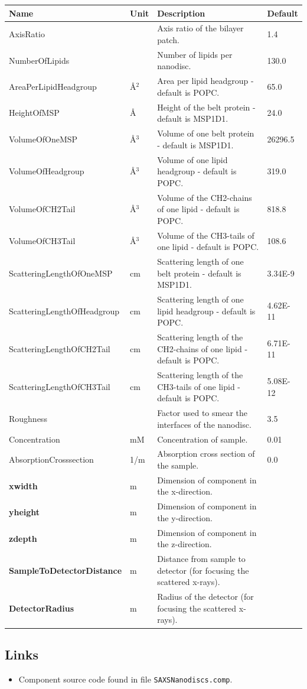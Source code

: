 \begin{longtable}{p{}p{}p{}p{}}
\toprule
\textbf{Name} & \textbf{Unit} & \textbf{Description} & \textbf{Default} \\
\midrule
\endhead
AxisRatio &  & Axis ratio of the bilayer patch. & 1.4 \\
NumberOfLipids &  & Number of lipids per nanodisc. & 130.0 \\
AreaPerLipidHeadgroup & \AA{}$^{2}$ & Area per lipid headgroup - default is POPC. & 65.0 \\
HeightOfMSP & \AA{} & Height of the belt protein - default is MSP1D1. & 24.0 \\
VolumeOfOneMSP & \AA{}$^{3}$ & Volume of one belt protein - default is MSP1D1. & 26296.5 \\
VolumeOfHeadgroup & \AA{}$^{3}$ & Volume of one lipid headgroup - default is POPC. & 319.0 \\
VolumeOfCH2Tail & \AA{}$^{3}$ & Volume of the CH2-chains of one lipid - default is POPC. & 818.8 \\
VolumeOfCH3Tail & \AA{}$^{3}$ & Volume of the CH3-tails of one lipid - default is POPC. & 108.6 \\
ScatteringLengthOfOneMSP & cm & Scattering length of one belt protein - default is MSP1D1. & 3.34E-9 \\
ScatteringLengthOfHeadgroup & cm & Scattering length of one lipid headgroup - default is POPC. & 4.62E-11 \\
ScatteringLengthOfCH2Tail & cm & Scattering length of the CH2-chains of one lipid - default is POPC. & 6.71E-11 \\
ScatteringLengthOfCH3Tail & cm & Scattering length of the CH3-tails of one lipid - default is POPC. & 5.08E-12 \\
Roughness &  & Factor used to smear the interfaces of the nanodisc. & 3.5 \\
Concentration & mM & Concentration of sample. & 0.01 \\
AbsorptionCrosssection & 1/m & Absorption cross section of the sample. & 0.0 \\
\textbf{xwidth} & m & Dimension of component in the x-direction. &  \\
\textbf{yheight} & m & Dimension of component in the y-direction. &  \\
\textbf{zdepth} & m & Dimension of component in the z-direction. &  \\
\textbf{SampleToDetectorDistance} & m & Distance from sample to detector (for focusing the scattered x-rays). &  \\
\textbf{DetectorRadius} & m & Radius of the detector (for focusing the scattered x-rays). &  \\
\bottomrule
\end{longtable}

\subsection*{Links}
\begin{itemize}
  \item Component source code found in file \texttt{SAXSNanodiscs.comp}.
\end{itemize}

